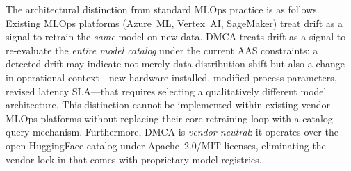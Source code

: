 The architectural distinction from standard MLOps practice
is as follows.
Existing MLOps platforms (Azure~ML, Vertex~AI, SageMaker)
treat drift as a signal to retrain the \emph{same} model on
new data.
DMCA treats drift as a signal to re-evaluate the \emph{entire
model catalog} under the current AAS constraints: a detected
drift may indicate not merely data distribution shift but also
a change in operational context—new hardware installed, modified
process parameters, revised latency SLA—that requires selecting
a qualitatively different model architecture.
This distinction cannot be implemented within existing
vendor MLOps platforms without replacing their core
retraining loop with a catalog-query mechanism.
Furthermore, DMCA is \emph{vendor-neutral}: it operates over
the open HuggingFace catalog under Apache~2.0/MIT licenses,
eliminating the vendor lock-in that comes with proprietary
model registries.

\begin{table}[t]
\caption{MLOps and drift-management approaches vs.\ DMCA.
  ``Re-selection'' = triggered model switch to a different
  architecture, not just retraining.
  ``Open catalog'' = vendor-neutral model source.}
\label{tab:mlops}
\centering\small
\renewcommand{\arraystretch}{1.15}
\end{table}

